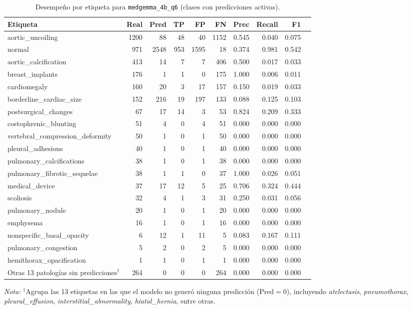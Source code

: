 \documentclass[../main.tex]{subfiles}
\begin{document}
\begin{table}[htbp]
\centering
\small
\setlength{\tabcolsep}{4pt}
\begin{tabular}{lrrrrrrrrr}
\toprule
\textbf{Etiqueta} & \textbf{Real} & \textbf{Pred} & \textbf{TP} & \textbf{FP} & \textbf{FN} & \textbf{Prec} & \textbf{Recall} & \textbf{F1} \\
\midrule
aortic\_uncoiling & 1200 & 88 & 48 & 40 & 1152 & 0.545 & 0.040 & 0.075 \\
normal & 971 & 2548 & 953 & 1595 & 18 & 0.374 & 0.981 & 0.542 \\
aortic\_calcification & 413 & 14 & 7 & 7 & 406 & 0.500 & 0.017 & 0.033 \\
breast\_implants & 176 & 1 & 1 & 0 & 175 & 1.000 & 0.006 & 0.011 \\
cardiomegaly & 160 & 20 & 3 & 17 & 157 & 0.150 & 0.019 & 0.033 \\
borderline\_cardiac\_size & 152 & 216 & 19 & 197 & 133 & 0.088 & 0.125 & 0.103 \\
postsurgical\_changes & 67 & 17 & 14 & 3 & 53 & 0.824 & 0.209 & 0.333 \\
costophrenic\_blunting & 51 & 4 & 0 & 4 & 51 & 0.000 & 0.000 & 0.000 \\
vertebral\_compression\_deformity & 50 & 1 & 0 & 1 & 50 & 0.000 & 0.000 & 0.000 \\
pleural\_adhesions & 40 & 1 & 0 & 1 & 40 & 0.000 & 0.000 & 0.000 \\
pulmonary\_calcifications & 38 & 1 & 0 & 1 & 38 & 0.000 & 0.000 & 0.000 \\
pulmonary\_fibrotic\_sequelae & 38 & 1 & 1 & 0 & 37 & 1.000 & 0.026 & 0.051 \\
medical\_device & 37 & 17 & 12 & 5 & 25 & 0.706 & 0.324 & 0.444 \\
scoliosis & 32 & 4 & 1 & 3 & 31 & 0.250 & 0.031 & 0.056 \\
pulmonary\_nodule & 20 & 1 & 0 & 1 & 20 & 0.000 & 0.000 & 0.000 \\
emphysema & 16 & 1 & 0 & 1 & 16 & 0.000 & 0.000 & 0.000 \\
nonspecific\_basal\_opacity & 6 & 12 & 1 & 11 & 5 & 0.083 & 0.167 & 0.111 \\
pulmonary\_congestion & 5 & 2 & 0 & 2 & 5 & 0.000 & 0.000 & 0.000 \\
hemithorax\_opacification & 1 & 1 & 0 & 1 & 1 & 0.000 & 0.000 & 0.000 \\
\midrule
Otras 13 patologías sin predicciones$^{\dagger}$ & 264 & 0 & 0 & 0 & 264 & 0.000 & 0.000 & 0.000 \\
\bottomrule
\end{tabular}
\caption{Desempeño por etiqueta para \texttt{medgemma\_4b\_q6} (clases con predicciones activas).}
\label{tab:q6_per_tag}
\vspace{0.5ex}
\raggedright \footnotesize \textit{Nota:} $^{\dagger}$Agrupa las 13 etiquetas en las que el modelo no generó ninguna predicción ($\text{Pred} = 0$), incluyendo \textit{atelectasis}, \textit{pneumothorax}, \textit{pleural\_effusion}, \textit{interstitial\_abnormality}, \textit{hiatal\_hernia}, entre otras.
\end{table}
\end{document}
